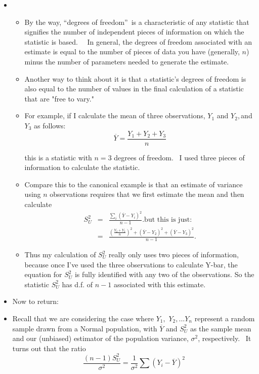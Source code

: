 \documentclass[11pt]{article}
\begin{document}
\begin{itemize}
\item 
\begin{itemize}
\item By the way, \textquotedblleft degrees of freedom\textquotedblright\ is
a characteristic of any statistic that signifies the number of independent
pieces of information on which the statistic is based. \ \ In general, the
degrees of freedom associated with an estimate is equal to the number of
pieces of data you have (generally, $n$) minus the number of parameters
needed to generate the estimate. \ \ 

\item Another way to think about it is that a statistic's degrees of freedom
is also equal to the number of values in the final calculation of a
statistic that are "free to vary."

\item For example, if I calculate the mean of three observations, $Y_{1}$
and $Y_{2},$and $Y_{3}$ as follows:%
\begin{equation*}
\overline{Y}=\frac{Y_{1}+Y_{2}+Y_{3}}{n}
\end{equation*}

this is a statistic with $n=3$ degrees of freedom. \ I used three pieces of
information to calculate the statistic.

\item Compare this to the canonical example is that an estimate of variance
using $n$ observations requires that we first estimate the mean and then
calculate%
\begin{eqnarray*}
S_{U}^{2} &=&\frac{\sum_{i}\left( \overline{Y}-Y_{i}\right) ^{2}}{n-1}.\text{
\ but this is just:} \\
&=&\frac{\left( \frac{Y_{2}+Y_{3}}{n}\right) ^{2}+\left( \overline{Y}%
-Y_{2}\right) ^{2}+\left( \overline{Y}-Y_{3}\right) ^{2}}{n-1}.
\end{eqnarray*}

\item Thus my calculation of $S_{U}^{2}$ really only uses two pieces of
information, because once I've used the three observations to calculate
Y-bar, the equation for $S_{U}^{2}$ is fully identified with any two of the
observations. So the statistic $S_{U}^{2}$ has d.f. of $n-1$ associated with
this estimate. \ 
\end{itemize}

\item Now to return:

\item Recall that we are considering the case where $Y_{1},$ $Y_{2},...Y_{n}$
represent a random sample drawn from a Normal population, with $\overline{Y}$
and $S_{U}^{2}$ as the sample mean and our (unbiased) estimator of the
population variance, $\sigma ^{2}$, respectively. \ It turns out that the
ratio%
\begin{equation*}
\frac{\left( n-1\right) S_{U}^{2}}{\sigma ^{2}}=\frac{1}{\sigma ^{2}}\sum
\left( Y_{i}-\overline{Y}\right) ^{2}
\end{equation*}


\end{itemize}
\end{document}
